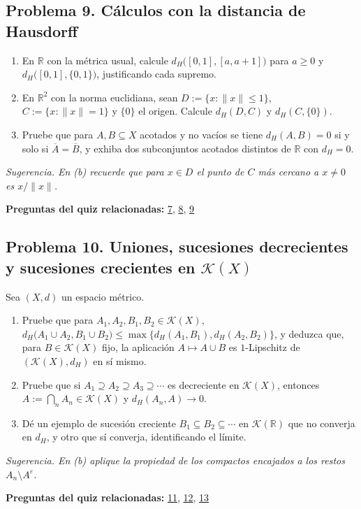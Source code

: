 \documentclass[11pt,a4paper]{article}
\begin{document}
\subsection*{\hypertarget{prob-9}{}Problema 9. Cálculos con la distancia de Hausdorff}
\begin{enumerate}[label=(\alph*),leftmargin=2.2em,itemsep=2pt]
\item[(a)] En $\mathbb{R}$ con la métrica usual, calcule $d_H\bigl([0,1],[a,a+1]\bigr)$ para $a\ge0$ y $d_H\bigl([0,1],\{0,1\}\bigr)$, justificando cada supremo.
\item[(b)] En $\mathbb{R}^{2}$ con la norma euclidiana, sean $D:=\{x:\|x\|\le1\}$, $C:=\{x:\|x\|=1\}$ y $\{0\}$ el origen. Calcule $d_H(D,C)$ y $d_H(C,\{0\})$.
\item[(c)] Pruebe que para $A,B\subseteq X$ acotados y no vacíos se tiene $d_H(A,B)=0$ si y solo si $\overline{A}=\overline{B}$, y exhiba dos subconjuntos acotados distintos de $\mathbb{R}$ con $d_H=0$.
\end{enumerate}
{\small\itshape Sugerencia. En (b) recuerde que para $x\in D$ el punto de $C$ más cercano a $x\ne0$ es $x/\|x\|$.}
\par{\small\textbf{Preguntas del quiz relacionadas:} \hyperlink{r-7}{7}, \hyperlink{r-8}{8}, \hyperlink{r-9}{9}}
\subsection*{\hypertarget{prob-10}{}Problema 10. Uniones, sucesiones decrecientes y sucesiones crecientes en $\mathcal K(X)$}
Sea $(X,d)$ un espacio métrico.
\begin{enumerate}[label=(\alph*),leftmargin=2.2em,itemsep=2pt]
\item[(a)] Pruebe que para $A_1,A_2,B_1,B_2\in\mathcal K(X)$, $d_H\bigl(A_1\cup A_2, B_1\cup B_2\bigr) \le\max\bigl\{d_H(A_1,B_1), d_H(A_2,B_2)\bigr\}$, y deduzca que, para $B\in\mathcal K(X)$ fijo, la aplicación $A\mapsto A\cup B$ es $1$-Lipschitz de $(\mathcal K(X),d_H)$ en sí mismo.
\item[(b)] Pruebe que si $A_1\supseteq A_2\supseteq A_3\supseteq\cdots$ es decreciente en $\mathcal K(X)$, entonces $A:=\bigcap_{n}A_n\in\mathcal K(X)$ y $d_H(A_n,A)\to0$.
\item[(c)] Dé un ejemplo de sucesión creciente $B_1\subseteq B_2\subseteq\cdots$ en $\mathcal K(\mathbb{R})$ que no converja en $d_H$, y otro que sí converja, identificando el límite.
\end{enumerate}
{\small\itshape Sugerencia. En (b) aplique la propiedad de los compactos encajados a los restos $A_n\setminus A^{\varepsilon}$.}
\par{\small\textbf{Preguntas del quiz relacionadas:} \hyperlink{r-11}{11}, \hyperlink{r-12}{12}, \hyperlink{r-13}{13}}
\end{document}
